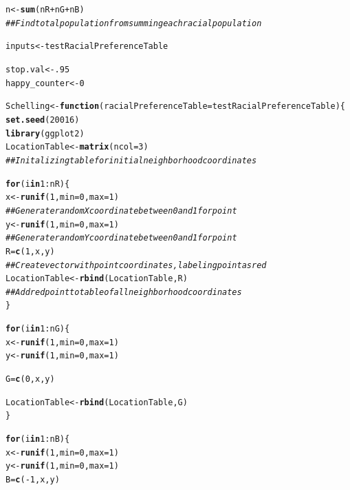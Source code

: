 \documentclass{article}\usepackage[]{graphicx}\usepackage[]{color}
\makeatletter
\newcommand{\hlnum}[1]{\textcolor[rgb]{0.686,0.059,0.569}{#1}}%
\newcommand{\hlcom}[1]{\textcolor[rgb]{0.678,0.584,0.686}{\textit{#1}}}%
\newcommand{\hlopt}[1]{\textcolor[rgb]{0,0,0}{#1}}%
\newcommand{\hlstd}[1]{\textcolor[rgb]{0.345,0.345,0.345}{#1}}%
\newcommand{\hlkwa}[1]{\textcolor[rgb]{0.161,0.373,0.58}{\textbf{#1}}}%
\newcommand{\hlkwb}[1]{\textcolor[rgb]{0.69,0.353,0.396}{#1}}%
\newcommand{\hlkwc}[1]{\textcolor[rgb]{0.333,0.667,0.333}{#1}}%
\newcommand{\hlkwd}[1]{\textcolor[rgb]{0.737,0.353,0.396}{\textbf{#1}}}%
\newenvironment{kframe}{%
 \def\at@end@of@kframe{}%
 \ifinner\ifhmode%
  \def\at@end@of@kframe{\end{minipage}}%
  \begin{minipage}{\columnwidth}%
 \fi\fi%
 \def\FrameCommand##1{\hskip\@totalleftmargin \hskip-\fboxsep
 \colorbox{shadecolor}{##1}\hskip-\fboxsep
     \hskip-\linewidth \hskip-\@totalleftmargin \hskip\columnwidth}%
 \MakeFramed {\advance\hsize-\width
   \@totalleftmargin\z@ \linewidth\hsize
   \@setminipage}}%
 {\par\unskip\endMakeFramed%
 \at@end@of@kframe}
\newenvironment{knitrout}{}{} %
\makeatother
\begin{document}
\begin{knitrout}
\begin{kframe}
\begin{alltt}
\hlstd{n} \hlkwb{<-} \hlkwd{sum}\hlstd{(nR} \hlopt{+} \hlstd{nG} \hlopt{+} \hlstd{nB)}
\hlcom{## Find total population from summing each racial population}

\hlstd{inputs} \hlkwb{<-} \hlstd{testRacialPreferenceTable}

\hlstd{stop.val} \hlkwb{<-} \hlnum{.95}
\hlstd{happy_counter} \hlkwb{<-} \hlnum{0}

\hlstd{Schelling} \hlkwb{<-} \hlkwa{function}\hlstd{(}\hlkwc{racialPreferenceTable} \hlstd{= testRacialPreferenceTable)\{}
  \hlkwd{set.seed}\hlstd{(}\hlnum{20016}\hlstd{)}
  \hlkwd{library}\hlstd{(ggplot2)}
  \hlstd{LocationTable} \hlkwb{<-} \hlkwd{matrix}\hlstd{(}\hlkwc{ncol} \hlstd{=} \hlnum{3}\hlstd{)}
  \hlcom{## Initalizing table for initial neighborhood coordinates}

  \hlkwa{for} \hlstd{(i} \hlkwa{in} \hlnum{1}\hlopt{:}\hlstd{nR)\{}
    \hlstd{x} \hlkwb{<-} \hlkwd{runif}\hlstd{(}\hlnum{1}\hlstd{,} \hlkwc{min}\hlstd{=}\hlnum{0}\hlstd{,} \hlkwc{max}\hlstd{=}\hlnum{1}\hlstd{)}
    \hlcom{## Generate random X coordinate between 0 and 1 for point}
    \hlstd{y} \hlkwb{<-} \hlkwd{runif}\hlstd{(}\hlnum{1}\hlstd{,} \hlkwc{min}\hlstd{=}\hlnum{0}\hlstd{,} \hlkwc{max}\hlstd{=}\hlnum{1}\hlstd{)}
    \hlcom{## Generate random Y coordinate between 0 and 1 for point}
    \hlstd{R} \hlkwb{=} \hlkwd{c}\hlstd{(}\hlnum{1}\hlstd{,x,y)}
    \hlcom{## Create vector with point coordinates, labeling point as red}
    \hlstd{LocationTable} \hlkwb{<-} \hlkwd{rbind}\hlstd{(LocationTable, R)}
    \hlcom{## Add red point to table of all neighborhood coordinates}
  \hlstd{\}}

  \hlkwa{for} \hlstd{(i} \hlkwa{in} \hlnum{1}\hlopt{:}\hlstd{nG)\{}
    \hlstd{x} \hlkwb{<-} \hlkwd{runif}\hlstd{(}\hlnum{1}\hlstd{,} \hlkwc{min}\hlstd{=}\hlnum{0}\hlstd{,} \hlkwc{max}\hlstd{=}\hlnum{1}\hlstd{)}
    \hlstd{y} \hlkwb{<-} \hlkwd{runif}\hlstd{(}\hlnum{1}\hlstd{,} \hlkwc{min}\hlstd{=}\hlnum{0}\hlstd{,} \hlkwc{max}\hlstd{=}\hlnum{1}\hlstd{)}

    \hlstd{G} \hlkwb{=} \hlkwd{c}\hlstd{(}\hlnum{0}\hlstd{,x,y)}

    \hlstd{LocationTable} \hlkwb{<-} \hlkwd{rbind}\hlstd{(LocationTable, G)}
  \hlstd{\}}

  \hlkwa{for} \hlstd{(i} \hlkwa{in} \hlnum{1}\hlopt{:}\hlstd{nB)\{}
    \hlstd{x} \hlkwb{<-} \hlkwd{runif}\hlstd{(}\hlnum{1}\hlstd{,} \hlkwc{min}\hlstd{=}\hlnum{0}\hlstd{,} \hlkwc{max}\hlstd{=}\hlnum{1}\hlstd{)}
    \hlstd{y} \hlkwb{<-} \hlkwd{runif}\hlstd{(}\hlnum{1}\hlstd{,} \hlkwc{min}\hlstd{=}\hlnum{0}\hlstd{,} \hlkwc{max}\hlstd{=}\hlnum{1}\hlstd{)}
    \hlstd{B} \hlkwb{=} \hlkwd{c}\hlstd{(}\hlopt{-}\hlnum{1}\hlstd{,x,y)}


\end{alltt}
\end{kframe}
\end{knitrout}
\end{document}
